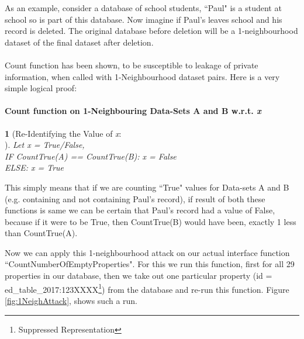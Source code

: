 \documentclass[12pt]{report}
\theoremstyle{named}
\newtheorem*{namedtheorem}{}
\begin{document}
As an example, consider a database of school students, ``Paul" is a student at school so is part of this database. Now imagine if Paul's leaves school and his record is deleted. The original database before deletion will be a 1-neighbourhood dataset of the final dataset after deletion.
\paragraph{}
Count function has been shown, to be susceptible to leakage of private information, when called with 1-Neighbourhood dataset pairs. Here is a very simple logical proof:


\paragraph{Count function on 1-Neighbouring Data-Sets A and B w.r.t. \textit{x}}
\begin{namedtheorem}[Re-Identifying the Value of \textit{x}:\\] 

Let x = True/False,\\ IF CountTrue(A) == CountTrue(B): x = False\\ELSE: x = True

\end{namedtheorem}

This simply means that if we are counting ``True" values for Data-sets A and B (e.g. containing and not containing Paul's record), if result of both these functions is same we can be certain that Paul's record had a value of False, because if it were to be True, then CountTrue(B) would have been, exactly 1 less than CountTrue(A).


Now we can apply this 1-neighbourhood attack on our actual interface function ``CountNumberOfEmptyProperties". For this we run this function, first for all 29 properties in our database, then we take out one particular property (id = ed\_table\_2017:123XXXX\footnote{Suppressed Representation}) from the database and re-run this function. Figure \ref{fig:1NeighAttack}, shows such a run.
\end{document}
